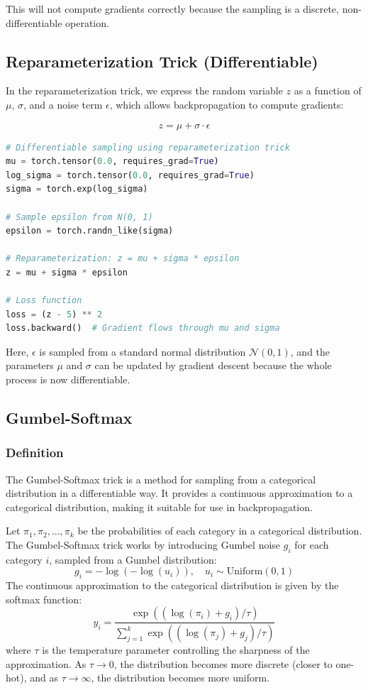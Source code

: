 \documentclass{article}
\begin{document}
This will not compute gradients correctly because the sampling is a discrete, non-differentiable operation.

\subsection{Reparameterization Trick (Differentiable)}

In the reparameterization trick, we express the random variable \( z \) as a function of \( \mu \), \( \sigma \), and a noise term \( \epsilon \), which allows backpropagation to compute gradients:

\[
z = \mu + \sigma \cdot \epsilon
\]

\begin{lstlisting}[language=Python]
# Differentiable sampling using reparameterization trick
mu = torch.tensor(0.0, requires_grad=True)
log_sigma = torch.tensor(0.0, requires_grad=True)
sigma = torch.exp(log_sigma)

# Sample epsilon from N(0, 1)
epsilon = torch.randn_like(sigma)

# Reparameterization: z = mu + sigma * epsilon
z = mu + sigma * epsilon

# Loss function
loss = (z - 5) ** 2
loss.backward()  # Gradient flows through mu and sigma
\end{lstlisting}

Here, \( \epsilon \) is sampled from a standard normal distribution \( \mathcal{N}(0, 1) \), and the parameters \( \mu \) and \( \sigma \) can be updated by gradient descent because the whole process is now differentiable.

\subsection{Gumbel-Softmax}

\subsubsection{Definition}

The Gumbel-Softmax trick is a method for sampling from a categorical distribution in a differentiable way. It provides a continuous approximation to a categorical distribution, making it suitable for use in backpropagation.

Let \( \pi_1, \pi_2, \dots, \pi_k \) be the probabilities of each category in a categorical distribution. The Gumbel-Softmax trick works by introducing Gumbel noise \( g_i \) for each category \( i \), sampled from a Gumbel distribution:
\[
g_i = -\log(-\log(u_i)), \quad u_i \sim \text{Uniform}(0, 1)
\]
The continuous approximation to the categorical distribution is given by the softmax function:
\[
y_i = \frac{\exp((\log(\pi_i) + g_i) / \tau)}{\sum_{j=1}^{k} \exp((\log(\pi_j) + g_j) / \tau)}
\]
where \( \tau \) is the temperature parameter controlling the sharpness of the approximation. As \( \tau \to 0 \), the distribution becomes more discrete (closer to one-hot), and as \( \tau \to \infty \), the distribution becomes more uniform.
\end{document}
